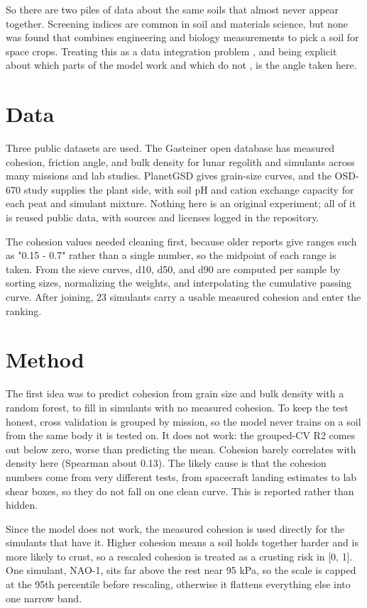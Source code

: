\documentclass[conference,letterpaper,10pt]{IEEEtran}
\begin{document}
So there are two piles of data about the same soils that almost never appear together. Screening indices are common in soil and materials science, but none was found that combines engineering and biology measurements to pick a soil for space crops. Treating this as a data integration problem \cite{doan}, and being explicit about which parts of the model work and which do not \cite{gundersen}, is the angle taken here.

\section{Data}
Three public datasets are used. The Gasteiner open database \cite{gasteiner} has measured cohesion, friction angle, and bulk density for lunar regolith and simulants across many missions and lab studies. PlanetGSD \cite{planetgsd} gives grain-size curves, and the OSD-670 study \cite{russell} supplies the plant side, with soil pH and cation exchange capacity for each peat and simulant mixture. Nothing here is an original experiment; all of it is reused public data, with sources and licenses logged in the repository.

The cohesion values needed cleaning first, because older reports give ranges such as "0.15 - 0.7" rather than a single number, so the midpoint of each range is taken. From the sieve curves, d10, d50, and d90 are computed per sample by sorting sizes, normalizing the weights, and interpolating the cumulative passing curve. After joining, 23 simulants carry a usable measured cohesion and enter the ranking.

\section{Method}
The first idea was to predict cohesion from grain size and bulk density with a random forest, to fill in simulants with no measured cohesion. To keep the test honest, cross validation is grouped by mission, so the model never trains on a soil from the same body it is tested on. It does not work: the grouped-CV R2 comes out below zero, worse than predicting the mean. Cohesion barely correlates with density here (Spearman about 0.13). The likely cause is that the cohesion numbers come from very different tests, from spacecraft landing estimates to lab shear boxes, so they do not fall on one clean curve. This is reported rather than hidden.

Since the model does not work, the measured cohesion is used directly for the simulants that have it. Higher cohesion means a soil holds together harder and is more likely to crust, so a rescaled cohesion is treated as a crusting risk in [0, 1]. One simulant, NAO-1, sits far above the rest near 95 kPa, so the scale is capped at the 95th percentile before rescaling, otherwise it flattens everything else into one narrow band.
\end{document}
